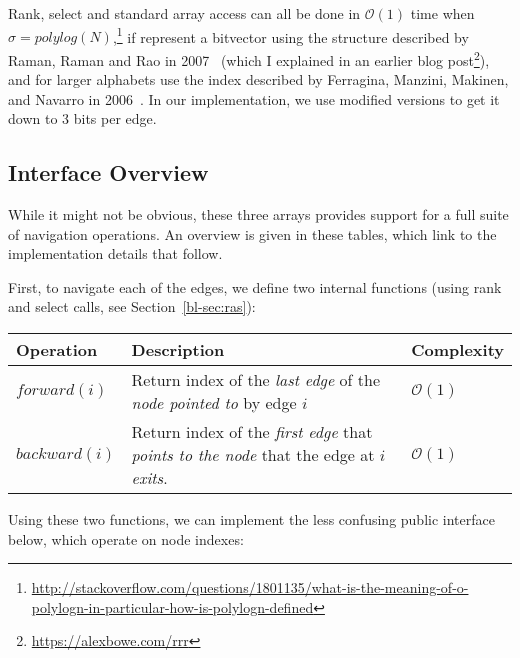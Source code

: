 Rank, select and standard array access can all be done in $\mathcal{O}(1)$ time when $\sigma=\textit{polylog}(N)$,\footnote{\url{http://stackoverflow.com/questions/1801135/what-is-the-meaning-of-o-polylogn-in-particular-how-is-polylogn-defined}} if represent a bitvector using the structure described by Raman, Raman and Rao in 2007~\cite{RRR07} (which I explained in an earlier blog post\footnote{\url{https://alexbowe.com/rrr}}), and for larger alphabets use the index described by Ferragina, Manzini, Makinen, and Navarro in 2006~\cite{FerManMakNav06}. In our implementation, we use modified versions to get it down to 3 bits per edge.

\subsection{Interface Overview}\label{bl-sec:int}

While it might not be obvious, these three arrays provides support for a full suite of navigation operations. An overview is given in these tables, which link to the implementation details that follow.

First, to navigate each of the edges, we define two internal functions (using rank and select calls, see Section~\ref{bl-sec:ras}):

\begin{center}
\small
\begin{tabularx}{\textwidth}{@{}lXl@{}}
\toprule  
{\bf Operation} & {\bf Description} & {\bf Complexity}\\
\midrule  
$\textit{forward}(i)$ & Return index of the \emph{last edge} of the \emph{node pointed to} by edge $i$ & $\mathcal{O}(1)$\\
$\textit{backward}(i)$ & Return index of the \emph{first edge} that \emph{points to the node} that the edge at $i$ \emph{exits}. & $\mathcal{O}(1)$\\
\bottomrule
\end{tabularx}
\end{center}

Using these two functions, we can implement the less confusing public interface below, which operate on node indexes:

